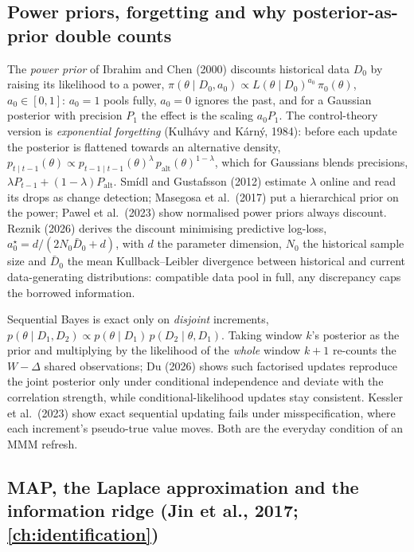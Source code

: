\subsection{Power priors, forgetting and why posterior-as-prior double counts}

The \emph{power prior} of Ibrahim and Chen (2000) discounts historical data $D_0$ by raising its likelihood to a power, $\pi(\theta \mid D_0, a_0) \propto L(\theta \mid D_0)^{a_0}\,\pi_0(\theta)$, $a_0 \in [0,1]$: $a_0 = 1$ pools fully, $a_0 = 0$ ignores the past, and for a Gaussian posterior with precision $P_1$ the effect is the scaling $a_0P_1$. The control-theory version is \emph{exponential forgetting} (Kulh\'avy and K\'arn\'y, 1984): before each update the posterior is flattened towards an alternative density, $p_{t\mid t-1}(\theta) \propto p_{t-1\mid t-1}(\theta)^{\lambda}\,p_{\mathrm{alt}}(\theta)^{1-\lambda}$, which for Gaussians blends precisions, $\lambda P_{t-1} + (1-\lambda)P_{\mathrm{alt}}$. Sm\'idl and Gustafsson (2012) estimate $\lambda$ online and read its drops as change detection; Masegosa et al.\ (2017) put a hierarchical prior on the power; Pawel et al.\ (2023) show normalised power priors always discount. Reznik (2026) derives the discount minimising predictive log-loss, $a_0^\star = d/(2N_0\bar D_0 + d)$, with $d$ the parameter dimension, $N_0$ the historical sample size and $\bar D_0$ the mean Kullback--Leibler divergence between historical and current data-generating distributions: compatible data pool in full, any discrepancy caps the borrowed information.

Sequential Bayes is exact only on \emph{disjoint} increments, $p(\theta \mid D_1, D_2) \propto p(\theta \mid D_1)\,p(D_2 \mid \theta, D_1)$. Taking window $k$'s posterior as the prior and multiplying by the likelihood of the \emph{whole} window $k+1$ re-counts the $W - \Delta$ shared observations; Du (2026) shows such factorised updates reproduce the joint posterior only under conditional independence and deviate with the correlation strength, while conditional-likelihood updates stay consistent. Kessler et al.\ (2023) show exact sequential updating fails under misspecification, where each increment's pseudo-true value moves. Both are the everyday condition of an MMM refresh.

\subsection{MAP, the Laplace approximation and the information ridge (Jin et al., 2017; \cref{ch:identification})}

